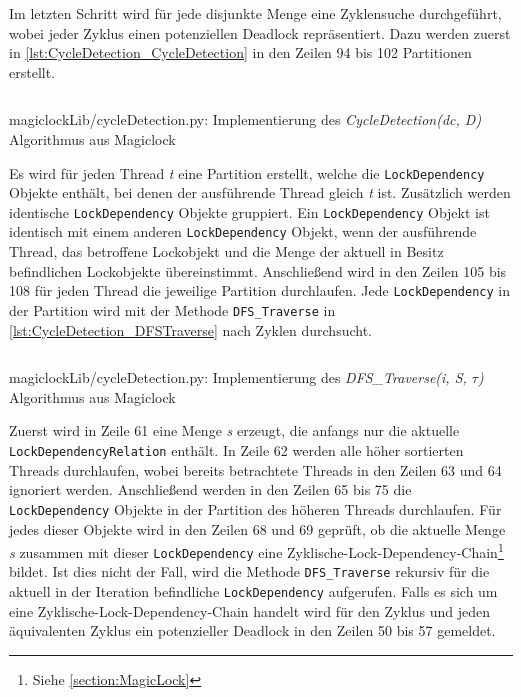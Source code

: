 Im letzten Schritt wird für jede disjunkte Menge eine Zyklensuche durchgeführt,
wobei jeder Zyklus einen potenziellen Deadlock repräsentiert. Dazu werden zuerst
in \cref{lst:CycleDetection_CycleDetection} in den Zeilen 94 bis 102 Partitionen
erstellt.
\begin{listing}[ht]
  \inputminted[frame=lines,linenos,firstline=78,lastline=108]{python}{./Python/magiclockLib/cycleDetection.py}
  \caption{magiclockLib/cycleDetection.py: Implementierung des \emph{CycleDetection(dc, D)} Algorithmus aus Magiclock\autocite[8]{MagicLock}}
  \label{lst:CycleDetection_CycleDetection}
\end{listing}
Es wird für jeden Thread \emph{t} eine Partition erstellt, welche die
\texttt{LockDependency} Objekte enthält, bei denen der ausführende Thread gleich
\emph{t} ist. Zusätzlich werden identische \texttt{LockDependency} Objekte
gruppiert. Ein \texttt{LockDependency} Objekt ist identisch mit einem anderen
\texttt{LockDependency} Objekt, wenn der ausführende Thread, das betroffene
Lockobjekt und die Menge der aktuell in Besitz befindlichen Lockobjekte
übereinstimmt. Anschließend wird in den Zeilen 105 bis 108 für jeden Thread die
jeweilige Partition durchlaufen. Jede \texttt{LockDependency} in der Partition
wird mit der Methode \texttt{DFS\_Traverse} in
\cref{lst:CycleDetection_DFSTraverse} nach Zyklen durchsucht.
\begin{listing}[ht]
  \inputminted[frame=lines,linenos,firstline=50,lastline=75]{python}{./Python/magiclockLib/cycleDetection.py}
  \caption{magiclockLib/cycleDetection.py: Implementierung des \emph{DFS\_Traverse(i, S, $\tau$)} Algorithmus aus Magiclock\autocite[8]{MagicLock}}
  \label{lst:CycleDetection_DFSTraverse}
\end{listing}
Zuerst wird in Zeile 61 eine Menge \emph{s} erzeugt, die anfangs nur die
aktuelle \texttt{LockDependencyRelation} enthält. In Zeile 62 werden alle höher
sortierten Threads durchlaufen, wobei bereits betrachtete Threads in den Zeilen
63 und 64 ignoriert werden. Anschließend werden in den Zeilen 65 bis 75 die
\texttt{LockDependency} Objekte in der Partition des höheren Threads
durchlaufen. Für jedes dieser Objekte wird in den Zeilen 68 und 69 geprüft, ob
die aktuelle Menge \emph{s} zusammen mit dieser \texttt{LockDependency} eine
Zyklische-Lock-Dependency-Chain\footnote{Siehe \cref{section:MagicLock}} bildet.
Ist dies nicht der Fall, wird die Methode \texttt{DFS\_Traverse} rekursiv für
die aktuell in der Iteration befindliche \texttt{LockDependency} aufgerufen.
Falls es sich um eine Zyklische-Lock-Dependency-Chain handelt wird für den
Zyklus und jeden äquivalenten Zyklus ein potenzieller Deadlock in den Zeilen 50
bis 57 gemeldet.